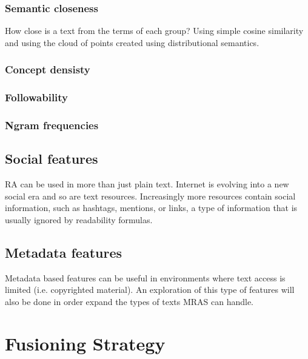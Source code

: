 \documentclass{bsu-ms}
\begin{document}
\subsubsection*{Semantic closeness}
How close is a text from the terms of each group?
Using simple cosine similarity and using the cloud of points created using distributional semantics.
\subsubsection*{Concept densisty}
\subsubsection*{Followability}
\subsubsection*{Ngram frequencies}
\subsection{Social features}
RA can be used in more than just plain text. Internet is evolving into a new social era and so are text resources. Increasingly more resources contain social information, such as hashtags, mentions, or links, a type of information that is usually ignored by readability formulas.

\subsection{Metadata features}
Metadata based features can be useful in environments where text access is limited (i.e. copyrighted material). An exploration of this type of features will also be done in order expand the types of texts MRAS can handle.




\section{Fusioning Strategy}
\label{sec:fusion}
\end{document}
